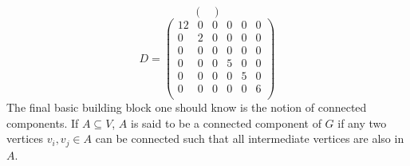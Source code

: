 \documentclass[a4paper]{article}
\begin{document}
\begin{multicols}{2}
$$\begin{pmatrix}
\end{pmatrix}
$$
$$
D = 
\begin{pmatrix}
12 & 0 & 0 & 0 & 0 & 0 \\
0 & 2 & 0 & 0 & 0 & 0 \\
0 & 0 & 0 & 0 & 0 & 0 \\
0 & 0 & 0 & 5 & 0 & 0 \\
0 & 0 & 0 & 0 & 5 & 0 \\
0 & 0 & 0 & 0 & 0 & 6 \\
\end{pmatrix}
$$
\newline
The final basic building block one should know is the notion of connected components. If $A \subseteq V$, $A$ is said to be a connected component of $G$ if any two vertices $v_i, v_j \in A$ can be connected such that all intermediate vertices are also in $A$.


\end{multicols}
\end{document}
